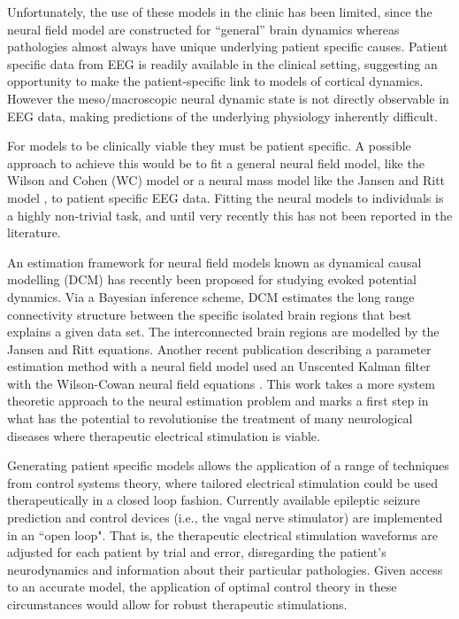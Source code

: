 \documentclass[12pt]{iopart}		%
\begin{document}
Unfortunately, the use of these models in the clinic has been limited, since the neural field model are constructed for ``general'' brain dynamics whereas pathologies almost always have unique underlying patient specific causes. Patient specific data from EEG is readily available in the clinical setting, suggesting an opportunity to make the patient-specific link to models of cortical dynamics. However the meso/macroscopic neural dynamic state is not directly observable in EEG data, making predictions of the underlying physiology inherently difficult.

For models to be clinically viable they must be patient specific. A possible approach to achieve this would be to fit a general neural field model, like the Wilson and Cohen (WC) \cite{Wilson1973} model or a neural mass model like the Jansen and Ritt model \cite{Jansen1995}, to patient specific EEG data. Fitting the neural models to individuals is a highly non-trivial task, and until very recently this has not been reported in the literature. 

An estimation framework for neural field models known as dynamical causal modelling (DCM) \cite{David2003} \cite{David2006} has recently been proposed for studying evoked potential dynamics. Via a Bayesian inference scheme, DCM estimates the long range connectivity structure between the specific isolated brain regions that best explains a given data set. The interconnected brain regions are modelled by the Jansen and Ritt equations. Another recent publication describing a parameter estimation method with a neural field model used an Unscented Kalman filter with the Wilson-Cowan neural field equations \cite{schiff2008kalman}.  This work takes a more system theoretic approach to the neural estimation problem and marks a first step in what has the potential to revolutionise the treatment of many neurological diseases where therapeutic electrical stimulation is viable.

Generating patient specific models allows the application of a range of techniques from control systems theory, where tailored electrical stimulation could be used therapeutically in a closed loop fashion.  Currently available epileptic seizure prediction and control devices (i.e., the vagal nerve stimulator) are implemented in an ``open loop".  That is, the therapeutic electrical stimulation waveforms are adjusted for each patient by trial and error, disregarding the patient's neurodynamics and information about their particular pathologies. Given access to an accurate model, the application of optimal control theory in these circumstances would allow for robust therapeutic stimulations.
\end{document}
